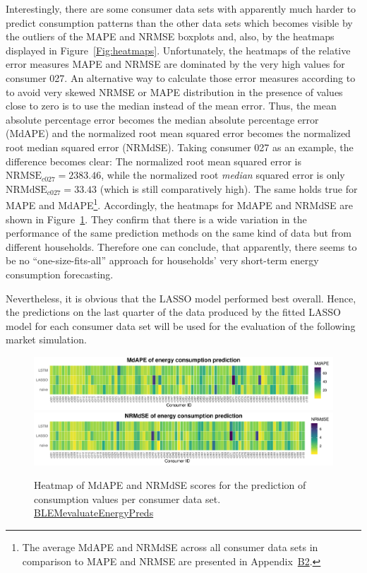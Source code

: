Interestingly, there are some consumer data sets with apparently much harder to predict consumption patterns than the other data sets which becomes visible by the outliers of the MAPE and NRMSE boxplots and, also, by the heatmaps displayed in Figure~\ref{Fig:heatmaps}. Unfortunately, the heatmaps of the relative error measures MAPE and NRMSE are dominated by the very high values for consumer 027. An alternative way to calculate those error measures according to \citet{Hyndman:2006} to avoid very skewed NRMSE or MAPE distribution in the presence of values close to zero is to use the median instead of the mean error. Thus, the mean absolute percentage error becomes the median absolute percentage error (MdAPE) and the normalized root mean squared error becomes the normalized root median squared error (NRMdSE). Taking consumer 027 as an example, the difference becomes clear: The normalized root mean squared error is $\text{NRMSE}_{c027}=2383.46$, while the normalized root \emph{median} squared error is only $\text{NRMdSE}_{c027}=33.43$ (which is still comparatively high). The same holds true for MAPE and MdAPE\footnote{The average MdAPE and NRMdSE across all consumer data sets in comparison to MAPE and NRMSE are presented in Appendix~\hyperlink{AppB2:Tables:avg_errM_wMedian}{B2}.}. Accordingly, the heatmaps for MdAPE and NRMdSE are shown in Figure~\ref{Fig:heatmaps_median}. They confirm that there is a wide variation in the performance of the same prediction methods on the same kind of data but from different households. Therefore one can conclude, that apparently, there seems to be no ``one-size-fits-all'' approach for households' very short-term energy consumption forecasting.

Nevertheless, it is obvious that the LASSO model performed best overall. Hence, the predictions on the last quarter of the data produced by the fitted LASSO model for each consumer data set will be used for the evaluation of the following market simulation.
%
\begin{figure}[htbp]
 \centering
 \includegraphics[width=\textwidth]{thesis/graphs/evaluation/c_heatmap_MdAPE.pdf}
 \includegraphics[width=\textwidth]{thesis/graphs/evaluation/c_heatmap_NRMdSE.pdf}
\caption[Heatmaps of MdAPE and NRMdSE for consumption values]{Heatmap of MdAPE and NRMdSE scores for the prediction of consumption values per consumer data set. \quantnet\href{ }{BLEMevaluateEnergyPreds}}
\label{Fig:heatmaps_median}
\end{figure}
%




